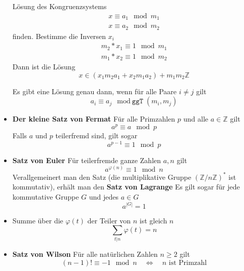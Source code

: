 \documentclass[landscape, 8pt, a4paper]{extarticle}
\newcommand{\ggT}{\texttt{ggT}}
\newcommand{\Z}{\mathbb{Z}}
\begin{document}
\begin{multicols}{3}
\begin{itemize}
		Lösung des Kongruenzsystems
		\begin{align*}
			x\equiv a_1\mod m_1\\
			x\equiv a_2\mod m_2
		\end{align*}
		finden. Bestimme die Inversen $x_i$
		\begin{align*}
			m_2*x_1\equiv 1 \mod m_1\\
			m_1*x_2\equiv 1 \mod m_2
		\end{align*}
		Dann ist die Lösung
		\begin{equation*}
			x\in (x_1m_2a_1+x_2m_1a_2)+m_1m_2\Z
		\end{equation*}

		Es gibt eine Lösung genau dann, wenn für alle Paare $i\neq j$ gilt
		\begin{equation*}
			a_i\equiv a_j\mod \ggT(m_i,m_j)
		\end{equation*}

		\item \textbf{Der kleine Satz von Fermat} Für alle Primzahlen $p$ und alle $a\in\Z$ gilt
		\begin{equation*}
			a^p\equiv a\mod p
		\end{equation*}
		Falls $a$ und $p$ teilerfremd sind, gilt sogar
		\begin{equation*}
			a^{p-1}\equiv 1\mod p
		\end{equation*}

		\item \textbf{Satz von Euler} Für teilerfremde ganze Zahlen $a,n$ gilt
		\begin{equation*}
			a^{\varphi(n)}\equiv 1 \mod n
		\end{equation*}
		Verallgemeinert man den Satz (die multiplikative Gruppe $(\Z/n\Z)^\ast$ ist kommutativ), erhält man den \textbf{Satz von Lagrange} Es gilt sogar für jede kommutative Gruppe $G$ und jedes $a\in G$ 
		\begin{equation*}
		 	a^{|G|}=1
		\end{equation*} 

		\item Summe über die $\varphi(t)$ der Teiler von $n$ ist gleich $n$
		\begin{equation*}
			\sum_{t|n}\varphi(t)=n
		\end{equation*}

		\item \textbf{Satz von Wilson} Für alle natürlichen Zahlen $n\geq 2$ gilt
		\begin{equation*}
			(n-1)!\equiv -1\mod n\quad\Leftrightarrow\quad n \text{ ist Primzahl}
		\end{equation*}
	\end{itemize}



\end{multicols}
\end{document}
